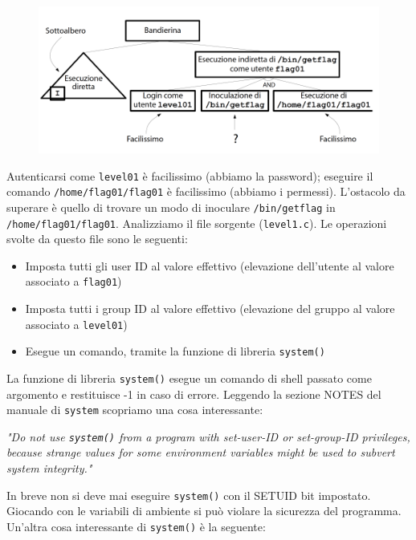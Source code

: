 \begin{figure}[hbpt!]
    \centering
    \includegraphics[width=0.8 \textwidth]{./Images/cap5/5.4.png}
\end{figure}
\FloatBarrier

Autenticarsi come \texttt{level01} è facilissimo (abbiamo la password); eseguire il comando \texttt{/home/flag01/flag01} è facilissimo (abbiamo i permessi). L'ostacolo da superare è quello di trovare un modo di inoculare \texttt{/bin/getflag} in \texttt{/home/flag01/flag01}. Analizziamo il file sorgente (\texttt{level1.c}). Le operazioni svolte da questo file sono le seguenti:
\begin{itemize}
    \item Imposta tutti gli user ID al valore effettivo
(elevazione dell'utente al valore associato a \texttt{flag01}) 
    \item Imposta tutti i group ID al valore effettivo
(elevazione del gruppo al valore associato a
\texttt{level01})
    \item Esegue un comando, tramite la funzione di libreria
\texttt{system()}
\end{itemize}
La funzione di libreria \texttt{system()} esegue un comando di shell passato come argomento e restituisce -1 in caso di errore. Leggendo la sezione NOTES del manuale di \texttt{system} scopriamo una cosa interessante:

\begin{center}
    \textit{"Do not use \texttt{system()} from a program with
set-user-ID or set-group-ID privileges,
because strange values for some
environment variables might be
used to subvert system integrity."}
\end{center}

In breve non si deve mai eseguire \texttt{system()} con il SETUID bit impostato. Giocando con le variabili di ambiente si può violare la sicurezza del programma. Un'altra cosa interessante di \texttt{system()} è la seguente:

